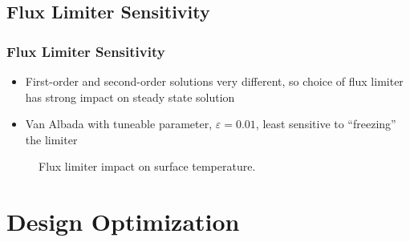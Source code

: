 \documentclass{beamer}
\begin{document}
\subsection{Flux Limiter Sensitivity}
\begin{frame}
  \frametitle{Flux Limiter Sensitivity}
  \begin{itemize}
    \item First-order and second-order solutions very different, so
      choice of flux limiter has strong impact on steady state solution
    \item Van Albada with tuneable parameter, $\varepsilon = 0.01$, least
      sensitive to ``freezing'' the limiter
  \end{itemize}
  \vspace{-0.5cm}
\begin{figure}[h]
  \centering
  \caption{Flux limiter impact on surface temperature.}
  \label{fig:vl-va-impact}
\end{figure}
\end{frame}

\section{Design Optimization}
\end{document}
